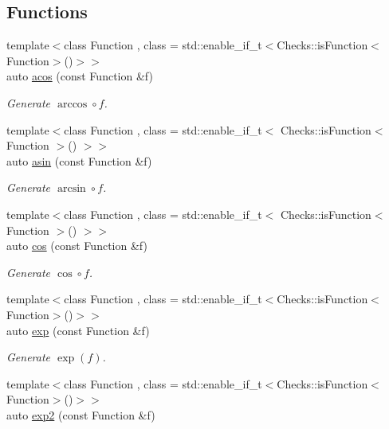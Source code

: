 \subsection*{Functions}
\begin{DoxyCompactItemize}
\item 
{\footnotesize template$<$class Function , class  = std\-::enable\-\_\-if\-\_\-t$<$\-Checks\-::is\-Function$<$\-Function$>$()$>$$>$ }\\auto \hyperlink{group__CMathGroup_gae9b7d3a479bcd8d48cf25f1c29edefb9}{acos} (const Function \&f)
\begin{DoxyCompactList}\small\item\em Generate $ \arccos\circ f $. \end{DoxyCompactList}\item 
{\footnotesize template$<$class Function , class  = std\-::enable\-\_\-if\-\_\-t$<$ Checks\-::is\-Function$<$ Function $>$() $>$$>$ }\\auto \hyperlink{group__CMathGroup_gad26443b289325876cffdaadfca770d51}{asin} (const Function \&f)
\begin{DoxyCompactList}\small\item\em Generate $ \arcsin\circ f $. \end{DoxyCompactList}\item 
{\footnotesize template$<$class Function , class  = std\-::enable\-\_\-if\-\_\-t$<$ Checks\-::is\-Function$<$ Function $>$() $>$$>$ }\\auto \hyperlink{group__CMathGroup_ga7e9b2ac717cd2350663293cb66ba6cbd}{cos} (const Function \&f)
\begin{DoxyCompactList}\small\item\em Generate $ \cos\circ f $. \end{DoxyCompactList}\item 
{\footnotesize template$<$class Function , class  = std\-::enable\-\_\-if\-\_\-t$<$\-Checks\-::is\-Function$<$\-Function$>$()$>$$>$ }\\auto \hyperlink{group__CMathGroup_ga00135c8521411f13813f9b972ea4e231}{exp} (const Function \&f)
\begin{DoxyCompactList}\small\item\em Generate $ \exp(f) $. \end{DoxyCompactList}\item 
{\footnotesize template$<$class Function , class  = std\-::enable\-\_\-if\-\_\-t$<$\-Checks\-::is\-Function$<$\-Function$>$()$>$$>$ }\\auto \hyperlink{group__CMathGroup_ga7724faf7db6e9583ac91df322c26ecf5}{exp2} (const Function \&f)

\end{DoxyCompactItemize}
